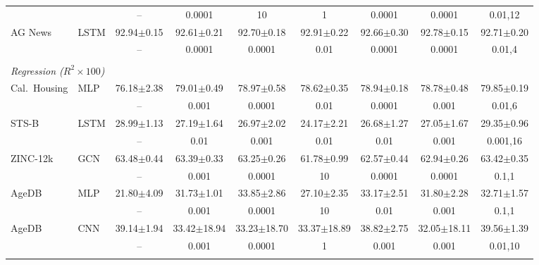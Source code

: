 \begin{table}[t]
\begin{center}
\begin{tabular}{llccccccc}
 & & {\tiny --} & {\tiny 0.0001} & {\tiny 10} & {\tiny 1} & {\tiny 0.0001} & {\tiny 0.0001} & {\tiny 0.01,12} \\[0.4ex]
AG News & LSTM & 92.94$\pm$0.15 & 92.61$\pm$0.21 & 92.70$\pm$0.18 & 92.91$\pm$0.22 & 92.66$\pm$0.30 & 92.78$\pm$0.15 & 92.71$\pm$0.20 \\
 & & {\tiny --} & {\tiny 0.0001} & {\tiny 0.0001} & {\tiny 0.01} & {\tiny 0.0001} & {\tiny 0.0001} & {\tiny 0.01,4} \\[0.4ex]
\\[-1.5ex]
\multicolumn{9}{l}{\emph{Regression ($R^2\times100$)}} \\[0.3ex]
Cal.\ Housing & MLP & 76.18$\pm$2.38 & 79.01$\pm$0.49 & 78.97$\pm$0.58 & 78.62$\pm$0.35 & 78.94$\pm$0.18 & 78.78$\pm$0.48 & 79.85$\pm$0.19 \\
 & & {\tiny --} & {\tiny 0.001} & {\tiny 0.0001} & {\tiny 0.01} & {\tiny 0.0001} & {\tiny 0.001} & {\tiny 0.01,6} \\[0.4ex]
STS-B & LSTM & 28.99$\pm$1.13 & 27.19$\pm$1.64 & 26.97$\pm$2.02 & 24.17$\pm$2.21 & 26.68$\pm$1.27 & 27.05$\pm$1.67 & 29.35$\pm$0.96 \\
 & & {\tiny --} & {\tiny 0.01} & {\tiny 0.001} & {\tiny 0.01} & {\tiny 0.01} & {\tiny 0.001} & {\tiny 0.001,16} \\[0.4ex]
ZINC-12k & GCN & 63.48$\pm$0.44 & 63.39$\pm$0.33 & 63.25$\pm$0.26 & 61.78$\pm$0.99 & 62.57$\pm$0.44 & 62.94$\pm$0.26 & 63.42$\pm$0.35 \\
 & & {\tiny --} & {\tiny 0.001} & {\tiny 0.0001} & {\tiny 10} & {\tiny 0.0001} & {\tiny 0.0001} & {\tiny 0.1,1} \\[0.4ex]
AgeDB & MLP & 21.80$\pm$4.09 & 31.73$\pm$1.01 & 33.85$\pm$2.86 & 27.10$\pm$2.35 & 33.17$\pm$2.51 & 31.80$\pm$2.28 & 32.71$\pm$1.57 \\
 & & {\tiny --} & {\tiny 0.001} & {\tiny 0.0001} & {\tiny 10} & {\tiny 0.01} & {\tiny 0.001} & {\tiny 0.1,1} \\[0.4ex]
AgeDB & CNN & 39.14$\pm$1.94 & 33.42$\pm$18.94 & 33.23$\pm$18.70 & 33.37$\pm$18.89 & 38.82$\pm$2.75 & 32.05$\pm$18.11 & 39.56$\pm$1.39 \\
 & & {\tiny --} & {\tiny 0.001} & {\tiny 0.0001} & {\tiny 1} & {\tiny 0.001} & {\tiny 0.001} & {\tiny 0.01,10} \\[0.4ex]
\\[-1.5ex]
\end{tabular}\end{center}\end{table}
